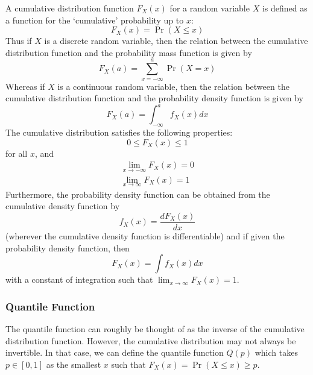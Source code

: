 \documentclass[11pt]{report} %
\begin{document}
A cumulative distribution function $F_{X}\left(x\right)$ for a random variable $X$ is defined as a function for the `cumulative' probability up to $x$:
\begin{equation}
F_{X}\left(x\right) = \operatorname{Pr}\left(X \leq x\right)
\end{equation}
Thus if $X$ is a discrete random variable, then the relation between the cumulative distribution function and the probability mass function is given by
\begin{equation}
F_{X}\left(a\right) = \sum_{x = -\infty}^{a}\operatorname{Pr}\left(X = x\right)
\end{equation}
Whereas if $X$ is a continuous random variable, then the relation between the cumulative distribution function and the probability density function is given by
\begin{equation}
F_{X}\left(a\right) = \int_{-\infty}^{a}f_{X}\left(x\right)dx
\end{equation}
The cumulative distribution satisfies the following properties:
\begin{equation}
0 \leq F_{X}\left(x\right) \leq 1
\end{equation}
for all $x$, and
\begin{gather}
\lim_{x\to -\infty}F_{X}\left(x\right) = 0 \\
\lim_{x\to \infty}F_{X}\left(x\right) = 1
\end{gather}
Furthermore, the probability density function can be obtained from the cumulative density function by
\begin{equation}
f_{X}\left(x\right) = \dfrac{dF_{X}\left(x\right)}{dx}
\end{equation}
(wherever the cumulative density function is differentiable) and if given the probability density function, then
\begin{equation}
F_{X}\left(x\right) = \int f_{X}\left(x\right)dx
\end{equation}
with a constant of integration such that $\lim_{x\to \infty}F_{X}\left(x\right) = 1$.

\subsubsection{Quantile Function}

The quantile function can roughly be thought of as the inverse of the cumulative distribution function. However, the cumulative distribution may not always be invertible. In that case, we can define the quantile function $Q\left(p\right)$ which takes $p\in\left[0, 1\right]$ as the smallest $x$ such that $F_{X}\left(x\right) = \operatorname{Pr}\left(X \leq x\right) \geq p$.
\end{document}

